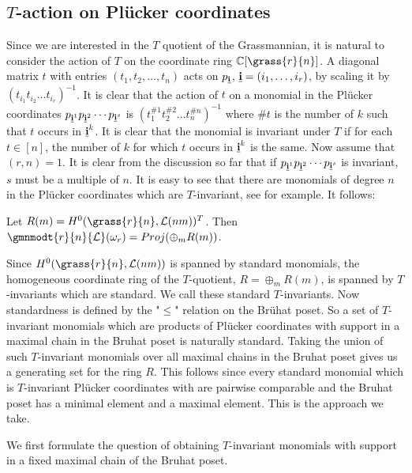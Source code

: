  \subsection{$T$-action on Pl\"{u}cker coordinates}
Since we are interested in the $T$ quotient of the Grassmannian, it is natural to consider the action of $T$ on the coordinate ring ${\mathbb C}[\grass{r}{n}]$.  A diagonal matrix $t$ with entries 
$(t_1,t_2,\ldots,t_n)$ acts on $p_{\bf \underline{i}}$, ${\bf \underline{i}} = (i_1,\ldots,i_r)$, by scaling it by $(t_{i_1}t_{i_2}\ldots t_{i_r})^{-1}$. It is clear that the action of $t$ on a monomial in
the Pl\"{u}cker coordinates $p_{{\bf \underline{i}}^1} p_{{\bf \underline{i}}^2} \cdots p_{{\bf \underline{i}}^s}$ is $(t_1^{\# 1} t_2^{\# 2}\ldots t_n^{\# n})^{-1}$ where $\# t$ is the number of $k$ such that
$t$ occurs in ${\bf \underline{i}}^k$. It is clear that the monomial is invariant under $T$ if for each $t \in [n]$, the number of $k$ for which $t$ occurs in ${\bf \underline{i}}^k$ is the same. 
Now assume that $(r,n)=1$. It is clear from the discussion so far that if $p_{{\bf \underline{i}}^1} p_{{\bf \underline{i}}^2} \cdots p_{{\bf \underline{i}}^s}$ is invariant,
$s$ must be a multiple of $n$. It is easy to see that there are monomials of degree $n$ in the Pl\"{u}cker coordinates which are $T$-invariant, see \cite{bakshi2020torus} for example. It follows:

\begin{theorem}
Let $R(m) = H^0(\grass{r}{n}, {\cal L}(nm))^T$. Then $\gmnmodt{r}{n}{\cal L}(\omega_r) = Proj(\oplus_m R(m))$.
\end{theorem}

Since $H^0(\grass{r}{n}, {\cal L}(nm))$ is spanned by standard monomials, the homogeneous coordinate ring of the $T$-quotient, $R=\oplus_m R(m)$, is spanned by $T$-invariants which are standard. We call these standard $T$-invariants.  Now standardness is defined by the "$\leq$" relation on the Br\"{u}hat poset. So a set of $T$-invariant monomials which are products of Pl\"{u}cker coordinates with support in a maximal chain in the Bruhat poset is naturally standard. Taking the union of such $T$-invariant monomials over all maximal chains in the Bruhat poset gives us a generating set for the ring $R$. This follows since every standard monomial which is $T$-invariant Pl\"{u}cker coordinates with are pairwise comparable  and the Bruhat poset has a minimal element and a maximal element. This is the approach we take.

We first formulate the question of obtaining $T$-invariant monomials with support in a fixed maximal chain of the Bruhat poset.
